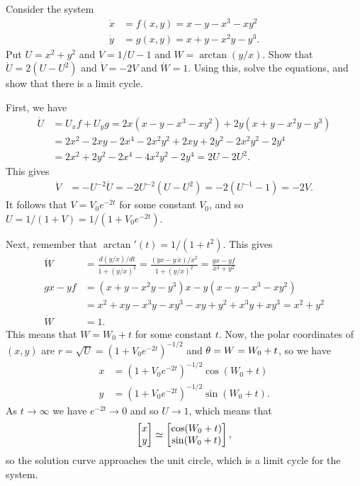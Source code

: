 \documentclass[a4paper]{amsart}
\begin{document}
\begin{exercise}\label{ex-limit-cycle}
 Consider the system
 \begin{align*}
  \dot{x} &= f(x,y) = x-y-x^3-xy^2 \\
  \dot{y} &= g(x,y) = x+y-x^2y-y^3.
 \end{align*}
 Put $U=x^2+y^2$ and $V=1/U-1$ and $W=\arctan(y/x)$.  Show that
 $\dot{U}=2(U-U^2)$ and $\dot{V}=-2V$ and $\dot{W}=1$.  Using this,
 solve the equations, and show that there is a limit cycle.
\end{exercise}
\begin{solution}
 First, we have
 \begin{align*}
  \dot{U} &= U_xf + U_yg 
           = 2x(x-y-x^3-xy^2) + 2y(x+y-x^2y-y^3) \\
          &= 2x^2-2xy-2x^4-2x^2y^2+2xy+2y^2-2x^2y^2-2y^4 \\
          &= 2x^2+2y^2-2x^4-4x^2y^2-2y^4 = 2U-2U^2.
 \end{align*}
 This gives
 \begin{align*}
  \dot{V} &= -U^{-2}\dot{U} 
           = -2U^{-2}(U-U^2) 
           = -2(U^{-1}-1) = -2V.
 \end{align*}
 It follows that $V=V_0e^{-2t}$ for some constant $V_0$, and so
 $U=1/(1+V)=1/(1+V_0e^{-2t})$.  

 Next, remember that $\arctan'(t)=1/(1+t^2)$.  This gives
 \begin{align*}
  \dot{W} &= \frac{d(y/x)/dt}{1+(y/x)^2} 
           = \frac{(\dot{y}x-y\,\dot{x})/x^2}{1+(y/x)^2} 
           = \frac{gx-yf}{x^2+y^2} \\
  gx-yf   &= (x+y-x^2y-y^3)x - y(x-y-x^3-xy^2) \\
          &= x^2+xy-x^3y-xy^3 - xy + y^2+x^3y+xy^3 
           = x^2+y^2 \\
  \dot{W} &= 1.
 \end{align*}
 This means that $W=W_0+t$ for some constant $t$.  Now, the polar
 coordinates of $(x,y)$ are $r=\sqrt{U}=(1+V_0e^{-2t})^{-1/2}$ and
 $\theta=W=W_0+t$, so we have
 \begin{align*}
  x &= (1+V_0e^{-2t})^{-1/2}\cos(W_0+t) \\
  y &= (1+V_0e^{-2t})^{-1/2}\sin(W_0+t).
 \end{align*}
 As $t\to\infty$ we have $e^{-2t}\to 0$ and so $U\to 1$, which means
 that 
 \[ \left[\begin{matrix} x\\ y\end{matrix}\right] \simeq \left[\begin{matrix} \cos(W_0+t) \\ \sin(W_0+t) \end{matrix}\right], \]
 so the solution curve approaches the unit circle, which is a limit
 cycle for the system.
\end{solution}
\end{document}
